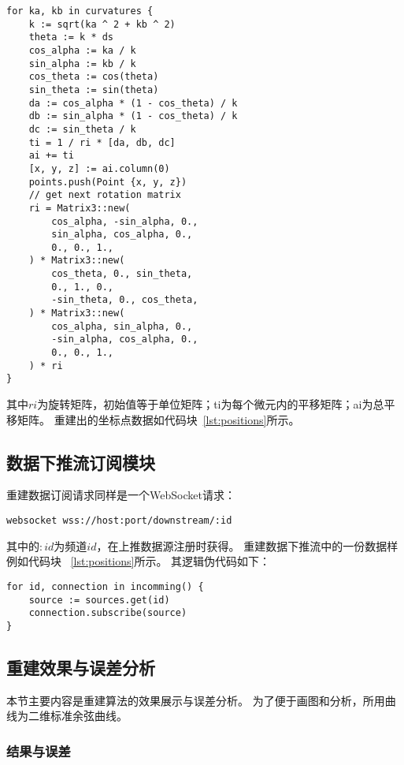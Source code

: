 \begin{lstlisting}[caption={曲线重建}]
for ka, kb in curvatures {
    k := sqrt(ka ^ 2 + kb ^ 2)
    theta := k * ds
    cos_alpha := ka / k
    sin_alpha := kb / k
    cos_theta := cos(theta)
    sin_theta := sin(theta)
    da := cos_alpha * (1 - cos_theta) / k
    db := sin_alpha * (1 - cos_theta) / k
    dc := sin_theta / k
    ti = 1 / ri * [da, db, dc]
    ai += ti
    [x, y, z] := ai.column(0)
    points.push(Point {x, y, z})
    // get next rotation matrix
    ri = Matrix3::new(
        cos_alpha, -sin_alpha, 0.,
        sin_alpha, cos_alpha, 0.,
        0., 0., 1.,
    ) * Matrix3::new(
        cos_theta, 0., sin_theta,
        0., 1., 0.,
        -sin_theta, 0., cos_theta,
    ) * Matrix3::new(
        cos_alpha, sin_alpha, 0.,
        -sin_alpha, cos_alpha, 0.,
        0., 0., 1.,
    ) * ri
}
\end{lstlisting}

其中$ri$为旋转矩阵，初始值等于单位矩阵；ti为每个微元内的平移矩阵；ai为总平移矩阵。
重建出的坐标点数据如代码块~\ref{lst:positions}所示。

\subsection{数据下推流订阅模块}

重建数据订阅请求同样是一个WebSocket请求：

\begin{lstlisting}[label={lst:subscribe},caption={重建数据订阅}]
websocket wss://host:port/downstream/:id
\end{lstlisting}

其中的$:id$为频道$id$，在上推数据源注册时获得。
重建数据下推流中的一份数据样例如代码块 ~\ref{lst:positions}所示。
其逻辑伪代码如下：

\begin{lstlisting}[caption={订阅数据源}]
for id, connection in incomming() {
    source := sources.get(id)
    connection.subscribe(source)
}
\end{lstlisting}

\subsection{重建效果与误差分析}

本节主要内容是重建算法的效果展示与误差分析。
为了便于画图和分析，所用曲线为二维标准余弦曲线。

\subsubsection{结果与误差}

